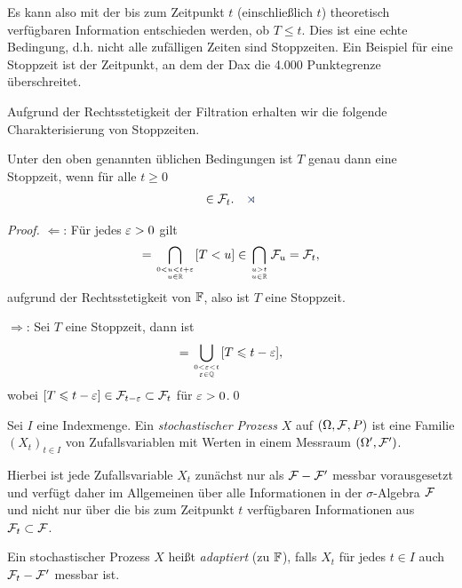 Es kann also mit der bis zum Zeitpunkt $t$ (einschließlich $t$)
theoretisch verfügbaren Information entschieden werden, ob $T\le t$. Dies ist
eine echte Bedingung, d.h. nicht alle zufälligen Zeiten sind Stoppzeiten. Ein
Beispiel für eine Stoppzeit ist der Zeitpunkt, an dem der Dax die 4.000
Punktegrenze überschreitet.

Aufgrund der Rechtsstetigkeit der Filtration erhalten wir die folgende
Charakterisierung von Stoppzeiten.

\begin{prop}
\label{prop:1.1}
Unter den oben genannten üblichen Bedingungen ist $T$ genau dann eine Stoppzeit,
wenn für alle $t\ge 0$
\begin{align*}
[T<t]\in\FF_t.\fish
\end{align*}
\end{prop}
\begin{proof}
$\Leftarrow$: Für jedes $\varepsilon > 0$ gilt
\begin{align*}
[T\le t] = \bigcap_{\atop{0 < u < t+\ep}{u\in\R}} [T< u]
\in \bigcap_{\atop{u > t}{u\in\R}} \FF_u = \FF_t,
\end{align*}
aufgrund der Rechtsstetigkeit von $\mathbb{F}$, also ist $T$ eine Stoppzeit.

$\Rightarrow$: Sei $T$ eine Stoppzeit, dann ist
\begin{align*}
[T < t] = \bigcup_{\atop{0 < \ep < t}{\ep\in\Q}} [T\le t-\ep],
\end{align*}
wobei $[T\leqslant t-\varepsilon] \in \mathcal{F}_{t-\varepsilon}\subset \mathcal{F}_t$ für $\varepsilon > 0$.\qed
\end{proof}

\begin{defn}
\label{defn:1.3}
%
Sei $I$ eine Indexmenge. Ein \emph{stochastischer
Prozess} $X$ auf $(\Omega, \mathcal{F},P)$ ist eine
Familie $(X_t)_{t\in I}$ von Zufallsvariablen mit Werten in einem Messraum $(\Omega',\mathcal{F}')$.\fish
\end{defn}

Hierbei ist jede Zufallsvariable $X_t$ zunächst nur als $\mathcal{F}-\mathcal{F}'$ messbar
vorausgesetzt und verfügt daher im Allgemeinen über alle Informationen in der
$\sigma$-Algebra $\mathcal{F}$ und nicht nur über die bis zum Zeitpunkt $t$ verfügbaren
Informationen aus $\mathcal{F}_t\subset \mathcal{F}$.

\begin{defn}
\label{defn:1.4}
Ein stochastischer Prozess $X$ heißt \emph{adaptiert} (zu $\mathbb{F}$), falls
$X_t$ für jedes $t\in I$ auch $\mathcal{F}_t-\mathcal{F}'$ messbar ist.\fish 
\end{defn}

